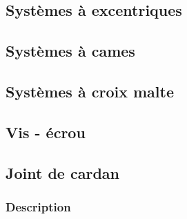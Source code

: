 \documentclass[11pt,oneside]{article}
\begin{document}
\subsection{Systèmes à excentriques}
\subsection{Systèmes à cames}
\subsection{Systèmes à croix malte}
\subsection{Vis - écrou}


\newpage
\subsection{Joint de cardan}
\subsubsection{Description}
\end{document}
